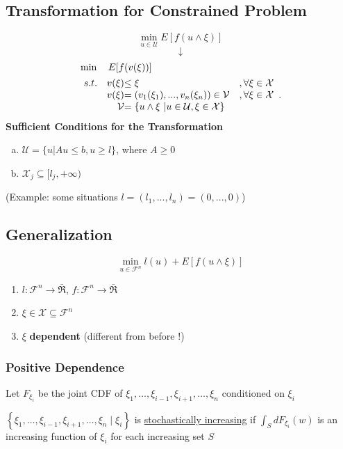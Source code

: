 \documentclass[11pt,a4paper]{article}
\begin{document}
\subsection{Transformation for Constrained Problem}
$$\min_{u\in \mathcal{U}} E[f(u\wedge \xi)]$$
$$\downarrow $$
\begin{align*}
    &\min\quad E[f(v(\xi))]\\
    &\begin{array}{r@{\quad}r@{}l@{\quad}l}
    s.t.
    &v(\xi)&\leq \xi&,\forall \xi\in \mathcal{X}\\
    &v(\xi)&=(v_1(\xi_1),...,v_n(\xi_n))\in \mathcal{V}&, \forall \xi\in \mathcal{X} \\
    &\mathcal{V}&=\{u\wedge\xi\ | u\in \mathcal{U},\xi\in \mathcal{X}\}&
\end{array} .
\end{align*}
\textbf{Sufficient Conditions for the Transformation}
\begin{enumerate}[(a)]
    \item $\mathcal{U}=\{u|Au\leq b,u\geq l\}$, where $A\geq 0$
    \item $\mathcal{X}_j\subseteq[l_j,+\infty)$
\end{enumerate}
(Example: some situations $l=(l_1,...,l_n)=(0,...,0)$)

\subsection{Generalization}
$$\min_{u\in \mathcal{F}^n} l(u)+E[f(u\wedge \xi)]$$
\begin{enumerate}[$\bullet$]
    \item $l:\mathcal{F}^n \rightarrow \bar{\Re}$, $f:\mathcal{F}^n \rightarrow \bar{\Re}$
    \item $\xi\in \mathcal{X}\subseteq \mathcal{F}^n$
    \item $\xi$ \textbf{dependent} (different from before !)
\end{enumerate}

\subsubsection{Positive Dependence}
Let $F_{\xi_{i}}$ be the joint CDF of $\xi_{1}, \ldots, \xi_{i-1}, \xi_{i+1}, \ldots, \xi_{n}$ conditioned on $\xi_{i}$

$\left\{\xi_{1}, \ldots, \xi_{i-1}, \xi_{i+1}, \ldots, \xi_{n} \mid \xi_{i}\right\}$ is \underline{stochastically increasing} if
$\int_{S} d F_{\xi_{i}}(w)$ is an increasing function of $\xi_{i}$ for each increasing set $S$
\end{document}
